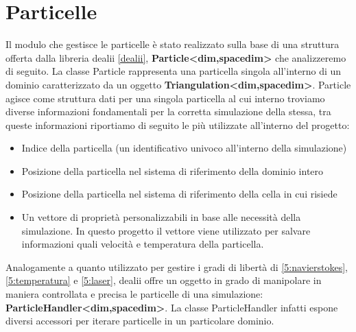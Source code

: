     \section{Particelle}\label{5:particelle}
    Il modulo che gestisce le particelle è stato realizzato sulla base di una struttura offerta dalla libreria dealii \ref*{dealii}, \textbf{Particle<dim,spacedim>} che analizzeremo di seguito.
    La classe Particle rappresenta una particella singola all'interno di un dominio caratterizzato da un oggetto \textbf{Triangulation<dim,spacedim>}. Particle agisce come
    struttura dati per una singola particella al cui interno troviamo diverse informazioni fondamentali per la corretta simulazione della stessa, tra queste informazioni riportiamo di seguito le
    più utilizzate all'interno del progetto:
    \begin{itemize}
        \item Indice della particella (un identificativo univoco all'interno della simulazione)
        \item Posizione della particella nel sistema di riferimento della dominio intero
        \item Posizione della particella nel sistema di riferimento della cella in cui risiede
        \item Un vettore di proprietà personalizzabili in base alle necessità della simulazione. In questo progetto il vettore viene utilizzato per salvare informazioni quali velocità e temperatura della particella.
    \end{itemize}
    Analogamente a quanto utilizzato per gestire i gradi di libertà di \ref*{5:navierstokes}, \ref*{5:temperatura} e \ref*{5:laser}, dealii offre un oggetto in grado di manipolare in maniera controllata e precisa
    le particelle di una simulazione: \textbf{ParticleHandler<dim,spacedim>}. La classe ParticleHandler infatti espone diversi accessori per iterare particelle in un particolare dominio.
